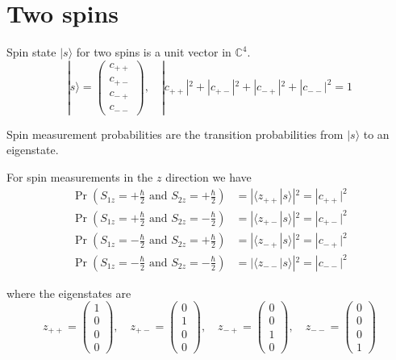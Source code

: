 

\section*{Two spins}

Spin state $|s\rangle$ for two spins is a unit vector in $\mathbb C^4$.
\begin{equation*}
|s\rangle=\begin{pmatrix}c_{++}\\c_{+-}\\c_{-+}\\c_{--}\end{pmatrix},\quad
|c_{++}|^2+|c_{+-}|^2+|c_{-+}|^2+|c_{--}|^2=1
\end{equation*}

Spin measurement probabilities are the transition probabilities from $|s\rangle$
to an eigenstate.

\bigskip
For spin measurements in the $z$ direction we have
\begin{align*}
\Pr\left(S_{1z}=+\tfrac{\hbar}{2}\text{ and }S_{2z}=+\tfrac{\hbar}{2}\right)
&=|\langle z_{++}|s\rangle|^2=|c_{++}|^2
\\
\Pr\left(S_{1z}=+\tfrac{\hbar}{2}\text{ and }S_{2z}=-\tfrac{\hbar}{2}\right)
&=|\langle z_{+-}|s\rangle|^2=|c_{+-}|^2
\\
\Pr\left(S_{1z}=-\tfrac{\hbar}{2}\text{ and }S_{2z}=+\tfrac{\hbar}{2}\right)
&=|\langle z_{-+}|s\rangle|^2=|c_{-+}|^2
\\
\Pr\left(S_{1z}=-\tfrac{\hbar}{2}\text{ and }S_{2z}=-\tfrac{\hbar}{2}\right)
&=|\langle z_{--}|s\rangle|^2=|c_{--}|^2
\end{align*}

where the eigenstates are
\begin{equation*}
z_{++}=\begin{pmatrix}1\\0\\0\\0\end{pmatrix},\quad
z_{+-}=\begin{pmatrix}0\\1\\0\\0\end{pmatrix},\quad
z_{-+}=\begin{pmatrix}0\\0\\1\\0\end{pmatrix},\quad
z_{--}=\begin{pmatrix}0\\0\\0\\1\end{pmatrix}
\end{equation*}

